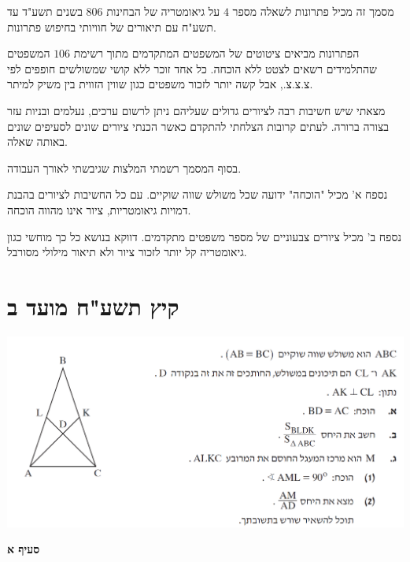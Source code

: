 \documentclass[12pt,a4paper]{article}
\newcommand*{\np}{\selectlanguage{english}\newpage\selectlanguage{hebrew}}
\begin{document}
מסמך זה מכיל פתרונות לשאלה מספר 
$4$
על גיאומטריה של הבחינות 
$806$
בשנים תשע"ד עד תשע"ח עם תיאורים של חוויותי בחיפוש פתרונות.

הפתרונות מביאים ציטוטים של המשפטים המתקדמים מתוך רשימת
$106$
המשפטים שהתלמידים רשאים לצטט ללא הוכחה. כל אחד זוכר ללא קושי שמשולשים חופפים לפי צ.צ.צ., אבל קשה יותר לזכור משפטים כגון שווין הזווית בין משיק למיתר.

מצאתי שיש חשיבות רבה לציורים גדולים שעליהם ניתן לרשום ערכים, נעלמים ובניות עזר בצורה ברורה. לעתים קרובות הצלחתי להתקדם כאשר הכנתי ציורים שונים לסעיפים שונים באותה שאלה.

בסוף המסמך רשמתי המלצות שגיבשתי לאורך העבודה.

נספח א' מכיל "הוכחה" ידועה שכל משולש שווה שוקיים. עם כל החשיבות לציורים בהבנת דמויות גיאומטריות, ציור אינו מהווה הוכחה.

נספח ב' מכיל ציורים צבעוניים של מספר משפטים מתקדמים. דווקא בנושא כל כך מוחשי כגון גיאומטריה קל יותר לזכור ציור ולא תיאור מילולי מסורבל.




\np

\section{קיץ תשע"ח מועד ב}

\begin{center}
\includegraphics[width=\textwidth]{summer-2018b-4}
\end{center}

\vspace{-3ex}

\textbf{סעיף א}
\end{document}
